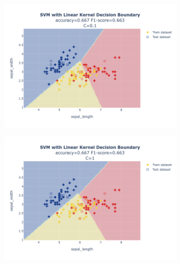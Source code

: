 \documentclass{article}
\begin{document}
\begin{figure}
\begin{subfigure}{0.3\textwidth}
        \includegraphics[scale=.13]{images/implementation/q1/linear_kernel/sepal_length_sepal_width_0.1.png}
    \end{subfigure}
    \hfill
    \begin{subfigure}{0.3\textwidth}
        \centering
        \includegraphics[scale=.13]{images/implementation/q1/linear_kernel/sepal_length_sepal_width_1.png}
    \end{subfigure}
    \hfill
    \begin{subfigure}{0.3\textwidth}
        \centering

\end{subfigure}
\end{figure}
\end{document}
